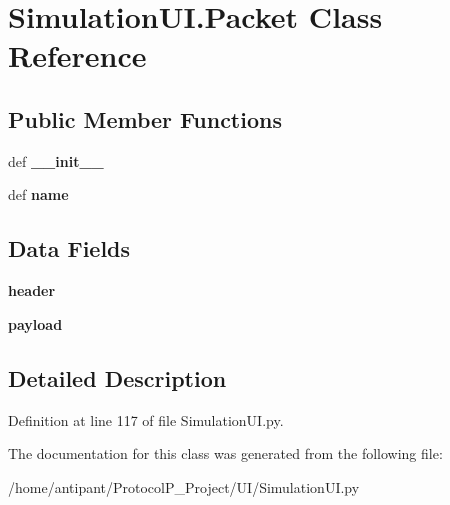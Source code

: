 \hypertarget{classSimulationUI_1_1Packet}{\section{Simulation\-U\-I.\-Packet Class Reference}
\label{classSimulationUI_1_1Packet}
}
\subsection*{Public Member Functions}
\begin{DoxyCompactItemize}
\item 
\hypertarget{classSimulationUI_1_1Packet_a244dfd6a6957079b6b8572f00ccaf333}{def {\bfseries \-\_\-\-\_\-init\-\_\-\-\_\-}}\label{classSimulationUI_1_1Packet_a244dfd6a6957079b6b8572f00ccaf333}

\item 
\hypertarget{classSimulationUI_1_1Packet_a09d64c7278685cff6d9171634018bab7}{def {\bfseries name}}\label{classSimulationUI_1_1Packet_a09d64c7278685cff6d9171634018bab7}

\end{DoxyCompactItemize}
\subsection*{Data Fields}
\begin{DoxyCompactItemize}
\item 
\hypertarget{classSimulationUI_1_1Packet_a27ca8d145d0fdcd886e724f22adfebc4}{{\bfseries header}}\label{classSimulationUI_1_1Packet_a27ca8d145d0fdcd886e724f22adfebc4}

\item 
\hypertarget{classSimulationUI_1_1Packet_a18a4813a80ec1ab6734cb4e9199b39be}{{\bfseries payload}}\label{classSimulationUI_1_1Packet_a18a4813a80ec1ab6734cb4e9199b39be}

\end{DoxyCompactItemize}


\subsection{Detailed Description}


Definition at line 117 of file Simulation\-U\-I.\-py.



The documentation for this class was generated from the following file\-:\begin{DoxyCompactItemize}
\item 
/home/antipant/\-Protocol\-P\-\_\-\-Project/\-U\-I/Simulation\-U\-I.\-py\end{DoxyCompactItemize}
